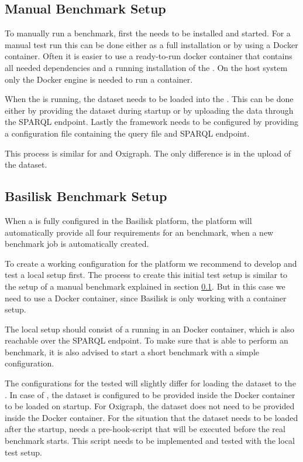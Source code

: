 \subsection{Manual Benchmark Setup}
\label{sec:eval_manual_benchmark_setup}
To manually run a benchmark, first the \ts{} needs to be installed and started.
For a manual test run this can be done either as a full installation or by using a Docker container.
Often it is easier to use a ready-to-run docker container that contains all needed dependencies and a running installation of the \ts{}.
On the host system only the Docker engine is needed to run a container.

When the \ts{} is running, the dataset needs to be loaded into the \ts{}.
This can be done either by providing the dataset during startup or by uploading the data through the SPARQL endpoint.
Lastly the \iguana{} framework needs to be configured by providing a configuration file containing the query file and SPARQL endpoint.

This process is similar for \tentris{} and Oxigraph.
The only difference is in the upload of the dataset.


\subsection{Basilisk Benchmark Setup}
When a \ts{} is fully configured in the Basilisk platform, the platform will automatically provide all four requirements for an benchmark, when a new benchmark job is automatically created.

To create a working \ts{} configuration for the platform we recommend to develop and test a local setup first.
The process to create this initial test setup is similar to the setup of a manual benchmark explained in section \ref{sec:eval_manual_benchmark_setup}.
But in this case we need to use a Docker container, since Basilisk is only working with a container setup.

The local setup should consist of a \ts{} running in an Docker container, which is also reachable over the SPARQL endpoint.
To make sure that \iguana{} is able to perform an benchmark, it is also advised to start a short benchmark with a simple \iguana{} configuration.

The \iguana{} configurations for the tested \tsp{} will slightly differ for loading the dataset to the \ts{}.
In case of \tentris{}, the dataset is configured to be provided inside the Docker container to be loaded on startup.
For Oxigraph, the dataset does not need to be provided inside the Docker container.
For the situation that the dataset needs to be loaded after the startup, \iguana{} needs a pre-hook-script that will be executed before the real benchmark starts.
This script needs to be implemented and tested with the local test setup.

